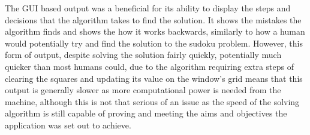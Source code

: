 \documentclass[]{final_report}
\begin{document}
\clearpage
The GUI based output was a beneficial for its ability to display the steps and decisions that the algorithm takes to find the solution. It shows the mistakes the algorithm finds and shows the how it works backwards, similarly to how a human would potentially try and find the solution to the sudoku problem. However, this form of output, despite solving the solution fairly quickly, potentially much quicker than most humans could, due to the algorithm requiring extra steps of clearing the squares and updating its value on the window’s grid means that this output is generally slower as more computational power is needed from the machine, although this is not that serious of an issue as the speed of the solving algorithm is still capable of proving and meeting the aims and objectives the application was set out to achieve. 
\end{document}
